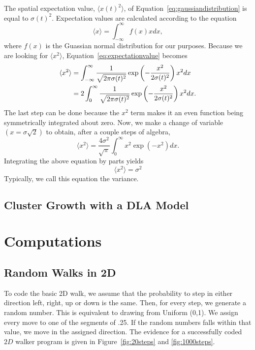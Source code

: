 \documentclass[12pt]{article}
\begin{document}
The spatial expectation value, $\langle x(t)^2\rangle$, of Equation~\ref{eq:gaussiandistribution} is equal to $\sigma(t)^2$. Expectation values are calculated according to the equation
\begin{equation}
  \label{eq:expectationvalue}
  \langle x\rangle = \int_{-\infty}^\infty f(x)xdx,
\end{equation}
where $f(x)$ is the Guassian normal distribution for our purposes. Because we are looking for $\langle x^2\rangle$, Equation~\ref{eq:expectationvalue} becomes
\begin{align}
  \label{eq:spatialexpectationvalueintegral}
  \langle x^2\rangle &= \int_{-\infty}^\infty \frac{1}{\sqrt{2\pi\sigma(t)^2}}\exp\left(-\frac{x^2}{2\sigma(t)^2}\right) x^2 dx \notag \\
  &= 2\int_{0}^\infty \frac{1}{\sqrt{2\pi\sigma(t)^2}}\exp\left(-\frac{x^2}{2\sigma(t)^2}\right) x^2 dx.
\end{align}
The last step can be done because the $x^2$ term makes it an even function being symmetrically integrated about zero. Now, we make a change of variable $(x=\sigma\sqrt{2})$ to obtain, after a couple steps of algebra,
\begin{equation}
  \label{eq:spatialexpectationvalue-simplified}
  \langle x^2\rangle = \frac{4\sigma^2}{\sqrt{\pi}}\int_0^\infty x^2 \exp(-x^2)dx.
\end{equation}
Integrating the above equation by parts yields
\begin{equation}
  \label{eq:variancesolved}
  \langle x^2 \rangle = \sigma^2
\end{equation}
Typically, we call this equation the variance. %

\subsection{Cluster Growth with a DLA Model}
\label{sec:clusterDLAmodel}

\section{Computations}
\label{sec:computations}

\subsection{Random Walks in 2D}
\label{sec:computationsRandomWalk}
To code the basic 2D walk, we assume that the probability to step in either direction left, right, up or down is the same. Then, for every step, we generate a random number. This is equivalent to drawing from Uniform (0,1). We assign every move to one of the segments of .25. If the random numbers falls within that value, we move in the assigned direction. The evidence for a successfully coded $2D$ walker program is given in Figure~\ref{fig:20steps} and \ref{fig:1000steps}.
\end{document}
